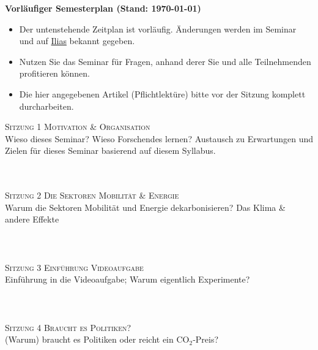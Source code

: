 \documentclass[12pt,a4paper]{article}
\begin{document}
\medskip
\noindent \textbf{Vorläufiger Semesterplan (Stand: \today)}
\begin{itemize}
    \item Der untenstehende Zeitplan ist vorläufig. Änderungen werden im Seminar und auf \href{https://ilias.unibe.ch/goto_ilias3_unibe_crs_3414477.html}{Ilias} bekannt gegeben.
    \item Nutzen Sie das Seminar für Fragen, anhand derer Sie und alle Teilnehmenden profitieren können. 
    \smallskip 
\item Die hier angegebenen Artikel (Pflichtlektüre) bitte vor der Sitzung komplett durcharbeiten. 
\end{itemize}
\medskip
\textsc{Sitzung 1 \dotfill Motivation \& Organisation} \smallskip \\ 
{\color{darkgreen}{\Rectangle}} Wieso dieses Seminar? Wieso Forschendes lernen? Austausch zu Erwartungen und Zielen für dieses Seminar basierend auf diesem Syllabus. \\
{\color{darkgreen}{\Rectangle}} 
\\ 
\medskip  \\	
\clearpage

\textsc{Sitzung 2 \dotfill Die Sektoren Mobilität \& Energie}  \smallskip \\ 
{\color{darkgreen}{\Rectangle}} Warum die Sektoren Mobilität und Energie dekarbonisieren? Das Klima \&  andere Effekte\\
{\color{darkgreen}{\Rectangle}}   \\ 
{\color{darkgreen}{\Rectangle}}  \\
\medskip  \\	


\textsc{Sitzung 3 \dotfill Einführung Videoaufgabe} \smallskip \\ 
{\color{darkgreen}{\Rectangle}} Einführung in die Videoaufgabe; Warum eigentlich Experimente?\\ 
{\color{darkgreen}{\Rectangle}}  \\ 
 {\color{darkgreen}{\Rectangle}}  \\ 
\medskip  \\	


\textsc{Sitzung 4 \dotfill Braucht es Politiken?} \smallskip \\ 
{\color{darkgreen}{\Rectangle}} (Warum) braucht es Politiken oder reicht ein CO$_2$-Preis?\\ 
{\color{darkgreen}{\Rectangle}}  \\ 
{\color{darkgreen}{\Rectangle}}    \\ 
\medskip  \\	
\end{document}
